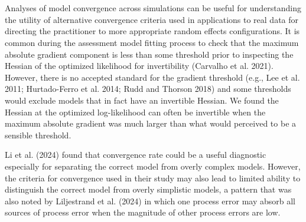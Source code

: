 \documentclass[
  12pt,
]{article}
\providecommand{\DIFadd}[1]{{\protect\color{blue}\uwave{#1}}} %
\providecommand{\DIFaddbegin}{} %
\providecommand{\DIFaddend}{} %
\providecommand{\DIFdelbegin}{} %
\providecommand{\DIFdelend}{} %
\newcommand{\DIFscaledelfig}{0.5}
\newlength{\DIFdelgraphicswidth} %
\newlength{\DIFdelgraphicsheight} %
\newcommand{\DIFaddincludegraphics}[2][]{{\color{blue}\fbox{\DIFOincludegraphics[#1]{#2}}}} %
\newcommand{\DIFdelincludegraphics}[2][]{%
\sbox{\DIFdelgraphicsbox}{\DIFOincludegraphics[#1]{#2}}%
\settoboxwidth{\DIFdelgraphicswidth}{\DIFdelgraphicsbox} %
\settoboxtotalheight{\DIFdelgraphicsheight}{\DIFdelgraphicsbox} %
\scalebox{\DIFscaledelfig}{%
\parbox[b]{\DIFdelgraphicswidth}{\usebox{\DIFdelgraphicsbox}\\[-\baselineskip] \rule{\DIFdelgraphicswidth}{0em}}\llap{\resizebox{\DIFdelgraphicswidth}{\DIFdelgraphicsheight}{%
\setlength{\unitlength}{\DIFdelgraphicswidth}%
\begin{picture}(1,1)%
\thicklines\linethickness{2pt} %
{\color[rgb]{1,0,0}\put(0,0){\framebox(1,1){}}}%
{\color[rgb]{1,0,0}\put(0,0){\line( 1,1){1}}}%
{\color[rgb]{1,0,0}\put(0,1){\line(1,-1){1}}}%
\end{picture}%
}\hspace*{3pt}}} %
} %
\DeclareRobustCommand{\DIFaddbegin}{\DIFOaddbegin \let\includegraphics\DIFaddincludegraphics} %
\DeclareRobustCommand{\DIFaddend}{\DIFOaddend \let\includegraphics\DIFOincludegraphics} %
\DeclareRobustCommand{\DIFdelbegin}{\DIFOdelbegin \let\includegraphics\DIFdelincludegraphics} %
\DeclareRobustCommand{\DIFdelend}{\DIFOaddend \let\includegraphics\DIFOincludegraphics} %
\begin{document}
\DIFdelbegin %
\DIFdelend \DIFaddbegin \section*{\DIFadd{Discussion}}\label{discussion}
\DIFaddend {}

\DIFdelbegin %
\DIFdelend \DIFaddbegin \subsection*{\DIFadd{Convergence}}\label{convergence-1}
\DIFaddend {}

Analyses of model convergence across simulations can be useful for
understanding the utility of alternative convergence criteria used in
applications to real data for directing the practitioner to more
appropriate random effects configurations. It is common during the
assessment model fitting process to check that the maximum absolute
gradient component is less than some threshold prior to inspecting the
Hessian of the optimized likelihood for invertibility (Carvalho et al.
2021). However, there is no accepted standard for the gradient threshold
(e.g., Lee et al. 2011; Hurtado-Ferro et al. 2014; Rudd and Thorson
2018) and some thresholds would exclude models that in fact have an
invertible Hessian. We found the Hessian at the optimized log-likelihood
can often be invertible when the maximum absolute gradient was much
larger than what would perceived to be a sensible threshold.

Li et al. (2024) found that convergence rate could be a useful
diagnostic especially for separating the correct model from overly
complex models. However, the criteria for convergence used in their
study may also lead to limited ability to distinguish the correct model
from overly simplistic models, a pattern that was also noted by
Liljestrand et al. (2024) in which one process error may absorb all
sources of process error when the magnitude of other process errors are
low.
\end{document}
